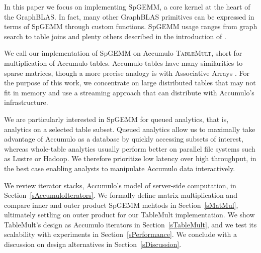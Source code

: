 
In this paper we focus on implementing SpGEMM, a core kernel at the
heart of the GraphBLAS.
In fact, many other GraphBLAS primitives can be expressed in terms of
SpGEMM through custom functions. 
SpGEMM usage ranges from graph search \cite{kepner2011graph} to table joins \cite{cohen2009mad} 
and plenty others described in the introduction of \cite{bulucc2010highly}.

We call our implementation of SpGEMM on Accumulo \textsc{TableMult}, short for multiplication of Accumulo tables.
Accumulo tables have many similarities to sparse matrices, though a more precise analogy is with Associative Arrays 
\cite{kepner2014gabb}. For the purpose of this work, we concentrate on
large distributed tables that may not fit in memory and use a streaming
approach that can distribute with Accumulo's infrastructure.

We are particularly interested in SpGEMM for queued analytics, that is, analytics on a selected table subset.  
Queued analytics allow us to maximally take advantage of Accumulo as a database 
by quickly accessing subsets of interest, 
whereas whole-table analytics usually perform better on parallel file systems such as Lustre or Hadoop.
We therefore prioritize low latency over high throughput, %
in the best case enabling analysts to manipulate Accumulo data interactively.


We review iterator stacks, Accumulo's model of server-side computation, in Section~\ref{sAccumuloIterators}.
We formally define matrix multiplication and compare inner and outer product SpGEMM mehtods
in Section~\ref{sMatMul}, ultimately settling on outer product for our TableMult implementation.
We show TableMult's design as Accumulo iterators in Section~\ref{sTableMult},
and we test its scalability with experiments in Section~\ref{sPerformance}.
We conclude with a discussion on design alternatives in Section~\ref{sDiscussion}.

